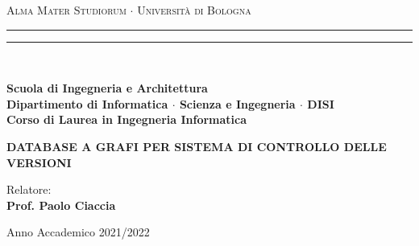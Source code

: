 \documentclass[12pt,a4paper]{report}
\begin{document}
\begin{titlepage}

    \begin{center}
        {{\Large{\textsc{Alma Mater Studiorum $\cdot$ Universit\`a di Bologna}}}}
        \rule[0.1cm]{15.8cm}{0.1mm}
        \rule[0.5cm]{15.8cm}{0.6mm}
        \\\vspace{3mm}

        {\small{\bf Scuola di Ingegneria e Architettura \\
                Dipartimento di Informatica $\cdot$ Scienza e Ingegneria $\cdot$ DISI\\
                Corso di Laurea in Ingegneria Informatica}}


    \end{center}

    \vspace{23mm}

    \begin{center}{
            \large \bf DATABASE A GRAFI PER SISTEMA DI CONTROLLO DELLE VERSIONI\par
        }\end{center}

    \vspace{40mm} \par \noindent

    \begin{minipage}[t]{0.47\textwidth}{
        \large{
        Relatore:
        \vspace{2mm}\\{
        \bf Prof. Paolo Ciaccia
        }
        }
        }
    \end{minipage}
    \hfill
    \begin{minipage}[t]{0.47\textwidth}
    \end{minipage}

    \vspace{40mm}

    \begin{center}
        Anno Accademico 2021/2022
    \end{center}

\end{titlepage}
\end{document}
